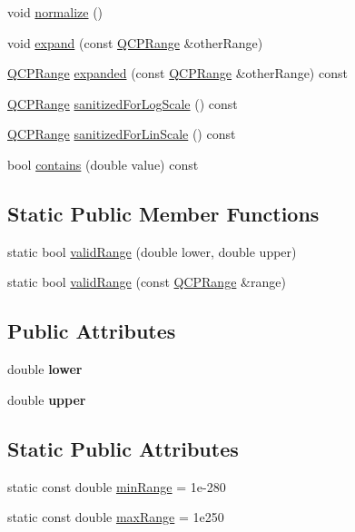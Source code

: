 \begin{DoxyCompactItemize}
void \hyperlink{class_q_c_p_range_af914a7740269b0604d0827c634a878a9}{normalize} ()
\item 
void \hyperlink{class_q_c_p_range_a0fa1bc8048be50d52bea93a8caf08305}{expand} (const \hyperlink{class_q_c_p_range}{Q\+C\+P\+Range} \&other\+Range)
\item 
\hyperlink{class_q_c_p_range}{Q\+C\+P\+Range} \hyperlink{class_q_c_p_range_a9cbfb7cd06eac1839cae981e05c19633}{expanded} (const \hyperlink{class_q_c_p_range}{Q\+C\+P\+Range} \&other\+Range) const
\item 
\hyperlink{class_q_c_p_range}{Q\+C\+P\+Range} \hyperlink{class_q_c_p_range_a3d66288d66e1d6df3636075eb42502ee}{sanitized\+For\+Log\+Scale} () const
\item 
\hyperlink{class_q_c_p_range}{Q\+C\+P\+Range} \hyperlink{class_q_c_p_range_a808751fdd9b17ef52327ba011df2e5f1}{sanitized\+For\+Lin\+Scale} () const
\item 
bool \hyperlink{class_q_c_p_range_ae9842b48b6d38dc5e9607358e3083cc8}{contains} (double value) const
\end{DoxyCompactItemize}
\subsection*{Static Public Member Functions}
\begin{DoxyCompactItemize}
\item 
static bool \hyperlink{class_q_c_p_range_ab38bd4841c77c7bb86c9eea0f142dcc0}{valid\+Range} (double lower, double upper)
\item 
static bool \hyperlink{class_q_c_p_range_a801b964752eaad6219be9d8a651ec2b3}{valid\+Range} (const \hyperlink{class_q_c_p_range}{Q\+C\+P\+Range} \&range)
\end{DoxyCompactItemize}
\subsection*{Public Attributes}
\begin{DoxyCompactItemize}
\item 
\hypertarget{class_q_c_p_range_aa3aca3edb14f7ca0c85d912647b91745}{}\label{class_q_c_p_range_aa3aca3edb14f7ca0c85d912647b91745} 
double {\bfseries lower}
\item 
\hypertarget{class_q_c_p_range_ae44eb3aafe1d0e2ed34b499b6d2e074f}{}\label{class_q_c_p_range_ae44eb3aafe1d0e2ed34b499b6d2e074f} 
double {\bfseries upper}
\end{DoxyCompactItemize}
\subsection*{Static Public Attributes}
\begin{DoxyCompactItemize}
\item 
static const double \hyperlink{class_q_c_p_range_ab46d3bc95030ee25efda41b89e2b616b}{min\+Range} = 1e-\/280
\item 
static const double \hyperlink{class_q_c_p_range_a5ca51e7a2dc5dc0d49527ab171fe1f4f}{max\+Range} = 1e250
\end{DoxyCompactItemize}
